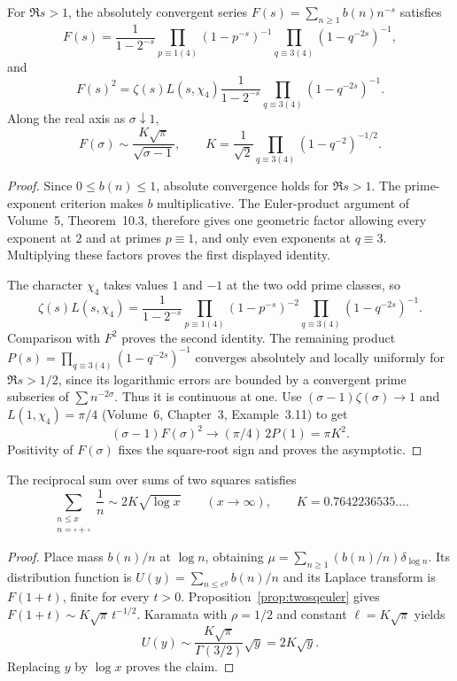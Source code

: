 \begin{proposition}\label{prop:twosqeuler}
For $\Re s>1$, the absolutely convergent series $F(s)=\sum_{n\ge1}b(n)n^{-s}$ satisfies
\[F(s)=\frac1{1-2^{-s}}\prod_{p\equiv1(4)}(1-p^{-s})^{-1}\prod_{q\equiv3(4)}(1-q^{-2s})^{-1},\]
and
\[F(s)^2=\zeta(s)L(s,\chi_4)\frac1{1-2^{-s}}\prod_{q\equiv3(4)}(1-q^{-2s})^{-1}.\]
Along the real axis as $\sigma\downarrow1$,
\[F(\sigma)\sim\frac{K\sqrt\pi}{\sqrt{\sigma-1}},\qquad
K=\frac1{\sqrt2}\prod_{q\equiv3(4)}(1-q^{-2})^{-1/2}.
\]
\end{proposition}
\begin{proof}
Since $0\le b(n)\le1$, absolute convergence holds for $\Re s>1$. The prime-exponent criterion makes $b$ multiplicative. The Euler-product argument of Volume~5, Theorem~10.3, therefore gives one geometric factor allowing every exponent at $2$ and at primes $p\equiv1$, and only even exponents at $q\equiv3$. Multiplying these factors proves the first displayed identity.

The character $\chi_4$ takes values $1$ and $-1$ at the two odd prime classes, so
\[\zeta(s)L(s,\chi_4)=\frac1{1-2^{-s}}\prod_{p\equiv1(4)}(1-p^{-s})^{-2}\prod_{q\equiv3(4)}(1-q^{-2s})^{-1}.
\]
Comparison with $F^2$ proves the second identity. The remaining product $P(s)=\prod_{q\equiv3(4)}(1-q^{-2s})^{-1}$ converges absolutely and locally uniformly for $\Re s>1/2$, since its logarithmic errors are bounded by a convergent prime subseries of $\sum n^{-2\sigma}$. Thus it is continuous at one. Use $(\sigma-1)\zeta(\sigma)\to1$ and $L(1,\chi_4)=\pi/4$ (Volume~6, Chapter~3, Example~3.11) to get
\[(\sigma-1)F(\sigma)^2\longrightarrow(\pi/4)\,2P(1)=\pi K^2.
\]
Positivity of $F(\sigma)$ fixes the square-root sign and proves the asymptotic.
\end{proof}

\begin{theorem}\label{thm:twosqlog}
The reciprocal sum over sums of two squares satisfies
\[\sum_{\substack{n\le x\\n=\square+\square}}\frac1n\sim2K\sqrt{\log x}\qquad(x\to\infty),\qquad K=0.7642236535\ldots.
\]
\end{theorem}
\begin{proof}
Place mass $b(n)/n$ at $\log n$, obtaining $\mu=\sum_{n\ge1}(b(n)/n)\delta_{\log n}$. Its distribution function is $U(y)=\sum_{n\le e^y}b(n)/n$ and its Laplace transform is $F(1+t)$, finite for every $t>0$. Proposition~\ref{prop:twosqeuler} gives $F(1+t)\sim K\sqrt\pi\,t^{-1/2}$. Karamata with $\rho=1/2$ and constant $\ell=K\sqrt\pi$ yields
\[U(y)\sim\frac{K\sqrt\pi}{\Gamma(3/2)}\sqrt y=2K\sqrt y.
\]
Replacing $y$ by $\log x$ proves the claim.
\end{proof}

